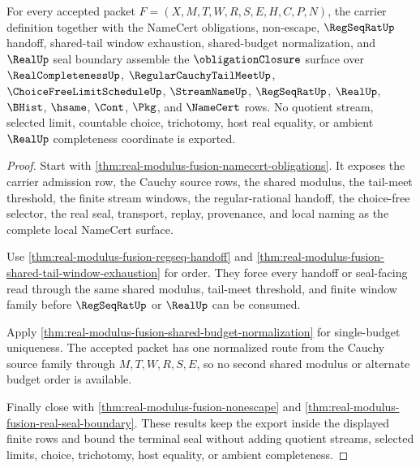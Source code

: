 \begin{theorem}
\label{thm:real-modulus-fusion-obligation-closure}
For every accepted packet $F=(X,M,T,W,R,S,E,H,C,P,N)$, the carrier definition together with the NameCert obligations, non-escape, $\RegSeqRatUp$ handoff, shared-tail window exhaustion, shared-budget normalization, and $\RealUp$ seal boundary assemble the $\obligationClosure$ surface over $\RealCompletenessUp$, $\RegularCauchyTailMeetUp$, $\ChoiceFreeLimitScheduleUp$, $\StreamNameUp$, $\RegSeqRatUp$, $\RealUp$, $\BHist$, $\hsame$, $\Cont$, $\Pkg$, and $\NameCert$ rows. No quotient stream, selected limit, countable choice, trichotomy, host real equality, or ambient $\RealUp$ completeness coordinate is exported.
\end{theorem}
\begin{proof}
Start with \autoref{thm:real-modulus-fusion-namecert-obligations}. It exposes the carrier admission row, the Cauchy source rows, the shared modulus, the tail-meet threshold, the finite stream windows, the regular-rational handoff, the choice-free selector, the real seal, transport, replay, provenance, and local naming as the complete local NameCert surface.

Use \autoref{thm:real-modulus-fusion-regseq-handoff} and \autoref{thm:real-modulus-fusion-shared-tail-window-exhaustion} for order. They force every handoff or seal-facing read through the same shared modulus, tail-meet threshold, and finite window family before $\RegSeqRatUp$ or $\RealUp$ can be consumed.

Apply \autoref{thm:real-modulus-fusion-shared-budget-normalization} for single-budget uniqueness. The accepted packet has one normalized route from the Cauchy source family through $M,T,W,R,S,E$, so no second shared modulus or alternate budget order is available.

Finally close with \autoref{thm:real-modulus-fusion-nonescape} and \autoref{thm:real-modulus-fusion-real-seal-boundary}. These results keep the export inside the displayed finite rows and bound the terminal seal without adding quotient streams, selected limits, choice, trichotomy, host equality, or ambient completeness.
\end{proof}

